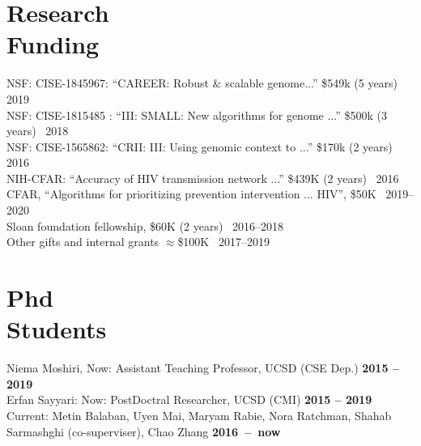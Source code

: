 \documentclass[margin,line,letterpaper]{resume}
\begin{document}
\begin{resume}
    
    
    \section{\mysidestyle Research\\Funding}
      NSF: CISE-1845967:  ``CAREER: Robust \& scalable genome...''
 \$549k (5 years)~
 \hfill 2019\\
      NSF: CISE-1815485 :  ``III: SMALL: New algorithms for genome ...''
 \$500k (3 years)~
 \hfill 2018\\
 NSF: CISE-1565862:  ``CRII: III: Using genomic context to ...''
 \$170k (2 years)~
 \hfill 2016\\
 NIH-CFAR:  ``Accuracy of HIV transmission network ...''
 \$439K (2 years)~
 \hfill 2016\\
 CFAR, ``Algorithms for prioritizing prevention intervention ... HIV'', \$50K \hfill  ~2019--2020\\
  Sloan foundation fellowship, \$60K (2 years) \hfill  ~2016--2018\\
 Other gifts and internal grants $\approx$\$100K  \hfill  ~2017--2019



\section{\mysidestyle Phd \\Students}
    Niema Moshiri, Now: Assistant Teaching Professor, UCSD (CSE Dep.)
 \hfill \textbf{2015 -- 2019}\\
     Erfan Sayyari:  Now: PostDoctral Researcher, UCSD (CMI)
 \hfill \textbf{2015 -- 2019}\\
Current: Metin Balaban, Uyen Mai, Maryam Rabie, Nora Ratchman, Shahab Sarmashghi (co-superviser), Chao Zhang \hfill \textbf{2016~--~now}





    \renewcommand*{\thefootnote}{\fnsymbol{footnote}}

\end{resume}
\end{document}
